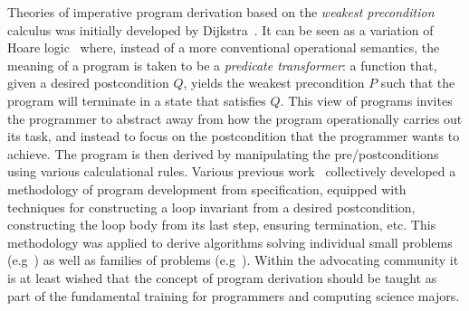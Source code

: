 \documentclass[runningheads]{llncs}
\begin{document}
Theories of imperative program derivation based on the \emph{weakest precondition} calculus was initially developed by Dijkstra~\cite{Dijkstra:75:Guarded}.
It can be seen as a variation of Hoare logic~\cite{Hoare:69:Axiomatic} where, instead of a more conventional operational semantics, the meaning of a program is taken to be a \emph{predicate transformer}: a function that, given a desired postcondition $Q$, yields the weakest precondition $P$ such that the program will terminate in a state that satisfies $Q$.
This view of programs invites the programmer to abstract away from how the program operationally carries out its task, and instead to focus on the postcondition that the programmer wants to achieve.
The program is then derived by manipulating the pre/postconditions using various calculational rules.
Various previous work~\cite{Dijkstra:76:Discipline,%
Gries:81:Science,Kaldewaij:90:Programming,Morgan:90:Programming,%
Backhouse:03:Program,Backhouse:11:Algorithmic} collectively developed a methodology of program development from specification, equipped with techniques for constructing a loop invariant from a desired postcondition, constructing the loop body from its last step, ensuring termination, etc.
This methodology was applied to derive algorithms
solving individual small problems
(e.g~\cite{Rem:89:Small,Rem:90:Small}) as well as families of problems (e.g~\cite{Zantema:92:Longest}).
Within the advocating community it is at least wished that the concept of program derivation should be taught as part of the fundamental training for programmers and computing science majors.
\end{document}

